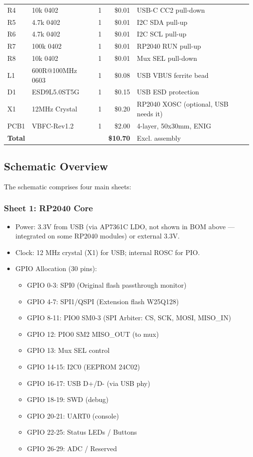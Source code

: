 \begin{longtable}{@{}llrrp{4cm}@{}}
R4 & 10k 0402 & 1 & \$0.01 & USB-C CC2 pull-down \\
R5 & 4.7k 0402 & 1 & \$0.01 & I2C SDA pull-up \\
R6 & 4.7k 0402 & 1 & \$0.01 & I2C SCL pull-up \\
R7 & 100k 0402 & 1 & \$0.01 & RP2040 RUN pull-up \\
R8 & 10k 0402 & 1 & \$0.01 & Mux SEL pull-down \\
L1 & 600R@100MHz 0603 & 1 & \$0.08 & USB VBUS ferrite bead \\
D1 & ESD9L5.0ST5G & 1 & \$0.15 & USB ESD protection \\
X1 & 12MHz Crystal & 1 & \$0.20 & RP2040 XOSC (optional, USB needs it) \\
PCB1 & VBFC-Rev1.2 & 1 & \$2.00 & 4-layer, 50x30mm, ENIG \\
\midrule
\textbf{Total} & & & \textbf{\$10.70} & Excl. assembly \\
\end{longtable}

\subsection{Schematic Overview}
The schematic comprises four main sheets:

\subsubsection{Sheet 1: RP2040 Core}
\begin{itemize}
    \item Power: 3.3V from USB (via AP7361C LDO, not shown in BOM above — integrated on some RP2040 modules) or external 3.3V.
    \item Clock: 12 MHz crystal (X1) for USB; internal ROSC for PIO.
    \item GPIO Allocation (30 pins):
    \begin{itemize}
        \item GPIO 0-3: SPI0 (Original flash passthrough monitor)
        \item GPIO 4-7: SPI1/QSPI (Extension flash W25Q128)
        \item GPIO 8-11: PIO0 SM0-3 (SPI Arbiter: CS, SCK, MOSI, MISO\_IN)
        \item GPIO 12: PIO0 SM2 MISO\_OUT (to mux)
        \item GPIO 13: Mux SEL control
        \item GPIO 14-15: I2C0 (EEPROM 24C02)
        \item GPIO 16-17: USB D+/D- (via USB phy)
        \item GPIO 18-19: SWD (debug)
        \item GPIO 20-21: UART0 (console)
        \item GPIO 22-25: Status LEDs / Buttons
        \item GPIO 26-29: ADC / Reserved
    \end{itemize}
\end{itemize}

